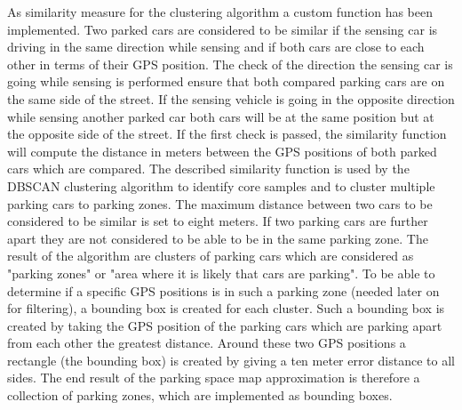 As similarity measure for the clustering algorithm a custom function has been implemented. Two parked cars are considered to be similar if the sensing car is driving in the same direction while sensing and if both cars are close to each other in terms of their GPS position. The check of the direction the sensing car is going while sensing is performed ensure that both compared parking cars are on the same side of the street. If the sensing vehicle is going in the opposite direction while sensing another parked car both cars will be at the same position but at the opposite side of the street. If the first check is passed, the similarity function will compute the distance in meters between the GPS positions of both parked cars which are compared. The described similarity function is used by the DBSCAN clustering algorithm to identify core samples and to cluster multiple parking cars to parking zones. The maximum distance between two cars to be considered to be similar is set to eight meters. If two parking cars are further apart they are not considered to be able to be in the same parking zone. 
The result of the algorithm are clusters of parking cars which are considered as "parking zones" or "area where it is likely that cars are parking". To be able to determine if a specific GPS positions is in such a parking zone (needed later on for filtering), a bounding box is created for each cluster. Such a bounding box is created by taking the GPS position of the parking cars which are parking apart from each other the greatest distance. Around these two GPS positions a rectangle (the bounding box) is created by giving a ten meter error distance to all sides. The end result of the parking space map approximation is therefore a collection of parking zones, which are implemented as bounding boxes.

